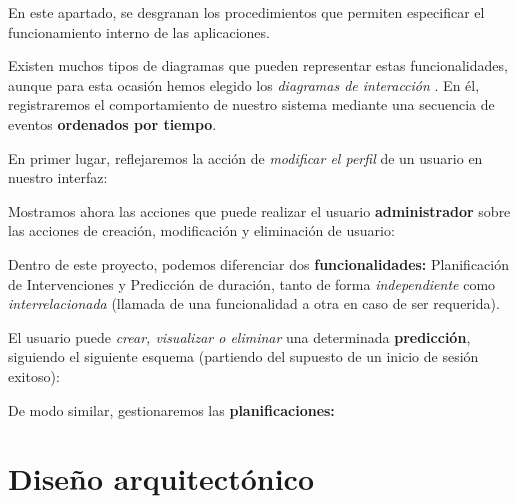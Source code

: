 En este apartado, se desgranan los procedimientos que permiten especificar el funcionamiento interno de las aplicaciones.

Existen muchos tipos de diagramas que pueden representar estas funcionalidades, aunque para esta ocasión hemos elegido los \textit{diagramas de interacción}  \cite{Britton2005IdentifyingDiagrams}. En él, registraremos el comportamiento de nuestro sistema mediante una secuencia de eventos \textbf{ordenados por tiempo}.

En primer lugar, reflejaremos la acción de \textit{modificar el perfil} de un usuario en nuestro interfaz:


Mostramos ahora las acciones que puede realizar el usuario \textbf{administrador} sobre las acciones de creación, modificación y eliminación de usuario:


Dentro de este proyecto, podemos diferenciar dos \textbf{funcionalidades:} Planificación de Intervenciones y Predicción de duración, tanto de forma \textit{independiente} como \textit{interrelacionada} (llamada de una funcionalidad a otra en caso de ser requerida).

El usuario puede \textit{crear, visualizar o eliminar} una determinada \textbf{predicción}, siguiendo el siguiente esquema (partiendo del supuesto de un inicio de sesión exitoso):


De modo similar, gestionaremos las \textbf{planificaciones:}




\section{Diseño arquitectónico}


